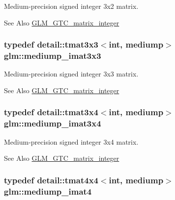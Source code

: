 Medium-\/precision signed integer 3x2 matrix. \begin{DoxySeeAlso}{See Also}
\hyperlink{group__gtc__matrix__integer}{G\-L\-M\-\_\-\-G\-T\-C\-\_\-matrix\-\_\-integer} 
\end{DoxySeeAlso}
\hypertarget{group__gtc__matrix__integer_gac5ee8dc182055bb0a00a90c031d4a714}{
\subsubsection[{mediump\-\_\-imat3x3}]{\setlength{\rightskip}{0pt plus 5cm}typedef detail\-::tmat3x3$<$int, mediump$>$ {\bf glm\-::mediump\-\_\-imat3x3}}}\label{group__gtc__matrix__integer_gac5ee8dc182055bb0a00a90c031d4a714}
Medium-\/precision signed integer 3x3 matrix. \begin{DoxySeeAlso}{See Also}
\hyperlink{group__gtc__matrix__integer}{G\-L\-M\-\_\-\-G\-T\-C\-\_\-matrix\-\_\-integer} 
\end{DoxySeeAlso}
\hypertarget{group__gtc__matrix__integer_gaaac79be4db34dde570c3331ffe728d55}{
\subsubsection[{mediump\-\_\-imat3x4}]{\setlength{\rightskip}{0pt plus 5cm}typedef detail\-::tmat3x4$<$int, mediump$>$ {\bf glm\-::mediump\-\_\-imat3x4}}}\label{group__gtc__matrix__integer_gaaac79be4db34dde570c3331ffe728d55}
Medium-\/precision signed integer 3x4 matrix. \begin{DoxySeeAlso}{See Also}
\hyperlink{group__gtc__matrix__integer}{G\-L\-M\-\_\-\-G\-T\-C\-\_\-matrix\-\_\-integer} 
\end{DoxySeeAlso}
\hypertarget{group__gtc__matrix__integer_gabf1a0fd4c85a21f67535b737e1feb355}{
\subsubsection[{mediump\-\_\-imat4}]{\setlength{\rightskip}{0pt plus 5cm}typedef detail\-::tmat4x4$<$int, mediump$>$ {\bf glm\-::mediump\-\_\-imat4}}}\label{group__gtc__matrix__integer_gabf1a0fd4c85a21f67535b737e1feb355}
